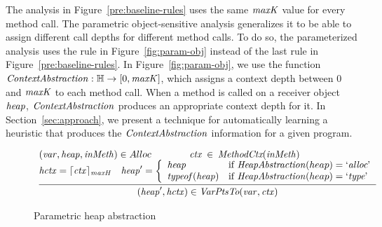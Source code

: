 The analysis in Figure~\ref{pre:baseline-rules} uses the same ${\it maxK}$ value for every method call.
The parametric object-sensitive analysis generalizes it to be able to assign different call depths for different method calls.
To do so, the parameterized analysis uses the rule
in Figure~\ref{fig:param-obj}
instead of the last rule in Figure~\ref{pre:baseline-rules}.
In Figure~\ref{fig:param-obj}, we use the function ${\it ContextAbstraction}: \mathbb{H} \to [0,{\it maxK}]$, which assigns a context depth between 0 and ${\it maxK}$ to each method call.
When a method is called on a receiver object  ${\it heap}$, ${\it ContextAbstraction}$
produces an appropriate context depth for it.
In Section~\ref{sec:approach}, we present a technique for automatically learning a heuristic that produces the ${\it ContextAbstraction}$ information for a given program.


\begin{figure}[t]
		\[
		\begin{array}{c}
		
		\infer[]{
			(\heap', \hctx) \in \VarPointsTo({\var}, {\ctx})
		}{ {(\var,\heap,\inmeth)\in Alloc} \qquad \qquad \ctx \in \MethodCtx(\inmeth) \qquad \qquad \qquad \qquad\\
		{ \hctx = \truncateCtx{\ctx}{\HeapDepth}}  \quad
		\heap' = \left\{
		\begin{array}{l@{\quad}l}
		\heap
		& \mbox{if}~ \heapAbstraction(heap) = \mbox{`\alloc'} \\
		\typeof(\heap)     & \mbox{if}~\heapAbstraction(heap) = \mbox{`\type'}
		\end{array}
		\right.		}
		\end{array}
	\]
	\caption{Parametric heap abstraction}
	\label{fig:param-heap}
	\end{figure}
	
\label{sec:param-heap}

